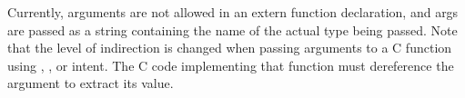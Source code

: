 Currently,  arguments are not allowed in an extern function
declaration, and  args are passed as a string containing the name of
the actual type being passed.  Note that the level of indirection is changed
when passing arguments to a C function using , ,
or  intent.  The C code implementing that function must dereference
the argument to extract its value.
